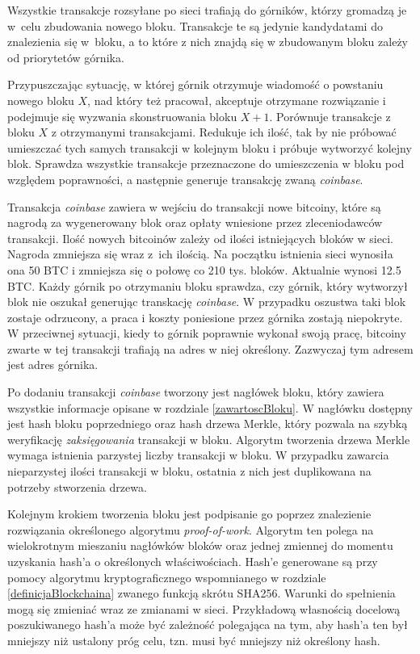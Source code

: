 \documentclass[12pt, twoside, final, openany]{mgr}
\begin{document}
\indent Wszystkie transakcje rozsyłane po sieci trafiają do górników, którzy gromadzą je w~celu zbudowania nowego bloku. Transakcje te są jedynie kandydatami do znalezienia się w~bloku, a to które z nich znajdą się w zbudowanym bloku zależy od priorytetów górnika. 

\indent Przypuszczając sytuację, w której górnik otrzymuje wiadomość o powstaniu nowego bloku $X$, nad który też pracował, akceptuje otrzymane rozwiązanie i podejmuje się wyzwania skonstruowania bloku $X+1$. Porównuje transakcje z bloku $X$ z otrzymanymi transakcjami. Redukuje ich ilość, tak by nie próbować umieszczać tych samych transakcji w kolejnym bloku i próbuje wytworzyć kolejny blok. Sprawdza wszystkie transakcje przeznaczone do umieszczenia w bloku pod względem poprawności, a następnie generuje transakcję zwaną \textit{coinbase}. 

\indent Transakcja \textit{coinbase} zawiera w wejściu do transakcji nowe bitcoiny, które są nagrodą za wygenerowany blok oraz opłaty wniesione przez zleceniodawców transakcji. Ilość nowych bitcoinów zależy od ilości istniejących bloków w sieci. Nagroda zmniejsza się wraz z~ich ilością. Na początku istnienia sieci wynosiła ona 50 BTC i zmniejsza się o połowę co 210 tys. bloków. Aktualnie wynosi 12.5 BTC. Każdy górnik po otrzymaniu bloku sprawdza, czy górnik, który wytworzył blok nie oszukał generując transkację \textit{coinbase}. W przypadku oszustwa taki blok zostaje odrzucony, a praca i koszty poniesione przez górnika zostają niepokryte. W przeciwnej sytuacji, kiedy to górnik poprawnie wykonał swoją pracę, bitcoiny zwarte w tej transakcji trafiają na adres w niej określony. Zazwyczaj tym adresem jest adres górnika.

\indent Po dodaniu transakcji \textit{coinbase} tworzony jest nagłówek bloku, który zawiera wszystkie informacje opisane w rozdziale \ref{zawartoscBloku}. W nagłówku dostępny jest hash bloku poprzedniego oraz hash drzewa Merkle, który pozwala na szybką weryfikację \textit{zaksięgowania} transakcji w bloku. Algorytm tworzenia drzewa Merkle wymaga istnienia parzystej liczby transakcji w bloku. W przypadku zawarcia nieparzystej ilości transakcji w bloku, ostatnia z nich jest duplikowana na potrzeby stworzenia drzewa.

\indent Kolejnym krokiem tworzenia bloku jest podpisanie go poprzez znalezienie rozwiązania określonego algorytmu \textit{proof-of-work}. Algorytm ten polega na wielokrotnym mieszaniu nagłówków bloków oraz jednej zmiennej do momentu uzyskania hash'a o określonych właściwościach. Hash'e generowane są przy pomocy algorytmu kryptograficznego wspomnianego w rozdziale \ref{definicjaBlockchaina} zwanego funkcją skrótu SHA256. Warunki do spełnienia mogą się zmieniać wraz ze zmianami w sieci. Przykładową własnością docelową poszukiwanego hash'a może być zależność polegająca na tym, aby hash'a ten był mniejszy niż ustalony próg celu, tzn. musi być mniejszy niż określony hash.
\end{document}
